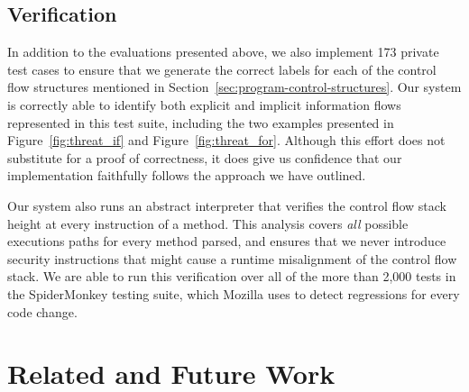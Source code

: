 \begin{comment}
\begin{figure}[htp]
  \centerline{\texttt{[image: graphics/evaluation\_falsepositives.pdf]}}
  \caption{Information flow alarms triggered when browsing Alexa's Top Sites in the United States~\cite{alexa}.}
  \label{fig:eval_falsepositives}
\end{figure}
\end{comment}

\subsection{Verification}

In addition to the evaluations presented above, we also implement 173 private test cases to ensure that we generate the correct labels for each of the control flow structures mentioned in Section~\ref{sec:program-control-structures}.
Our system is correctly able to identify both explicit and implicit information flows represented in this test suite, including the two examples presented in Figure~\ref{fig:threat_if} and Figure~\ref{fig:threat_for}.
Although this effort does not substitute for a proof of correctness, it does give us confidence that our implementation faithfully follows the approach we have outlined.

Our system also runs an abstract interpreter that verifies the control flow stack height at every instruction of a method.
This analysis covers \emph{all} possible executions paths for every method parsed, and ensures that we never introduce security instructions that might cause a runtime misalignment of the control flow stack.
We are able to run this verification over all of the more than 2,000 tests in the SpiderMonkey testing suite, which Mozilla uses to detect regressions for every code change.



\section{Related and Future Work}
\label{sec:relatedwork}


